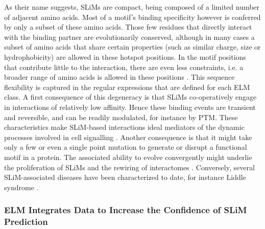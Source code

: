 \documentclass[12pt]{article}
\begin{document}
As their name suggests, SLiMs are compact, being composed of a limited number of
adjacent amino acids. Most of a motif's binding specificity however is conferred
by only a subset of these amino acids. Those few residues that directly interact
with the binding partner are evolutionarily conserved, although in many cases a
subset of amino acids that share certain properties (such as similar charge,
size or hydrophobicity) are allowed in these hotspot positions. In the motif
positions that contribute little to the interaction, there are even less
constraints, i.e. a broader range of amino acids is allowed in these positions
\citep{21909575}. This sequence flexibility is captured in the regular
expressions that are defined for each ELM class. A first consequence of this
degeneracy is that SLiMs co-operatively engage in interactions of relatively low
affinity. Hence these binding events are transient and reversible, and can be
readily modulated, for instance by PTM. These characteristics make SLiM-based
interactions ideal mediators of the dynamic processes involved in cell
signalling \citep{22480932}. Another consequence is that it might take only a few
or even a single point mutation to generate or disrupt a functional motif in a
protein. The associated ability to evolve convergently might underlie the
proliferation of SLiMs and the rewiring of interactomes \citep{26589632,
22346764}. Conversely, several SLiM-associated diseases have been
characterized to date, for instance Liddle syndrome \citep{15483078}.

\subsubsection*{ELM Integrates Data to Increase the Confidence of SLiM Prediction}
\end{document}
